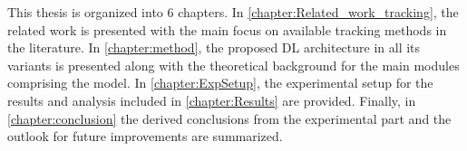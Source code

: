 This thesis is organized into 6 chapters. In \autoref{chapter:Related_work_tracking}, the related work is presented with the main focus on available tracking methods in the literature. In \autoref{chapter:method}, the proposed DL architecture in all its variants is presented along with the theoretical background for the main modules comprising the model. In \autoref{chapter:ExpSetup}, the experimental setup for the results and analysis included in \autoref{chapter:Results} are provided. Finally, in \autoref{chapter:conclusion} the derived conclusions from the experimental part and the outlook for future improvements are summarized.

